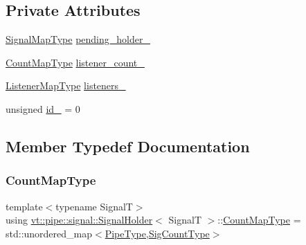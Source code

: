 \subsection*{Private Attributes}
\begin{DoxyCompactItemize}
\item 
\hyperlink{structvt_1_1pipe_1_1signal_1_1_signal_holder_a064e16bdc96f93675bc7fb967121a527}{Signal\+Map\+Type} \hyperlink{structvt_1_1pipe_1_1signal_1_1_signal_holder_abc4dda923a2844f99d62b8e0555fc2d8}{pending\+\_\+holder\+\_\+}
\item 
\hyperlink{structvt_1_1pipe_1_1signal_1_1_signal_holder_ade6904d6f651a864bf2e5a657a4b1a13}{Count\+Map\+Type} \hyperlink{structvt_1_1pipe_1_1signal_1_1_signal_holder_ab9ff9df04d2407c4fc5d9e0658f9baa0}{listener\+\_\+count\+\_\+}
\item 
\hyperlink{structvt_1_1pipe_1_1signal_1_1_signal_holder_a47bf4c2ab16e94467e6e5d3a29820276}{Listener\+Map\+Type} \hyperlink{structvt_1_1pipe_1_1signal_1_1_signal_holder_ad8784f84675b031bfb829da534f70fe9}{listeners\+\_\+}
\item 
unsigned \hyperlink{structvt_1_1pipe_1_1signal_1_1_signal_holder_ae20bae26dbb331089cab143f97fe2c92}{id\+\_\+} = 0
\end{DoxyCompactItemize}


\subsection{Member Typedef Documentation}
\mbox{\label{structvt_1_1pipe_1_1signal_1_1_signal_holder_ade6904d6f651a864bf2e5a657a4b1a13}} 
\subsubsection{\texorpdfstring{Count\+Map\+Type}{CountMapType}}
{\footnotesize\ttfamily template$<$typename SignalT$>$ \\
using \hyperlink{structvt_1_1pipe_1_1signal_1_1_signal_holder}{vt\+::pipe\+::signal\+::\+Signal\+Holder}$<$ SignalT $>$\+::\hyperlink{structvt_1_1pipe_1_1signal_1_1_signal_holder_ade6904d6f651a864bf2e5a657a4b1a13}{Count\+Map\+Type} =  std\+::unordered\+\_\+map$<$\hyperlink{namespacevt_ac9852acda74d1896f48f406cd72c7bd3}{Pipe\+Type},\hyperlink{structvt_1_1pipe_1_1signal_1_1_signal_holder_aced54515f402b63f6dea174e5b027c81}{Sig\+Count\+Type}$>$}

